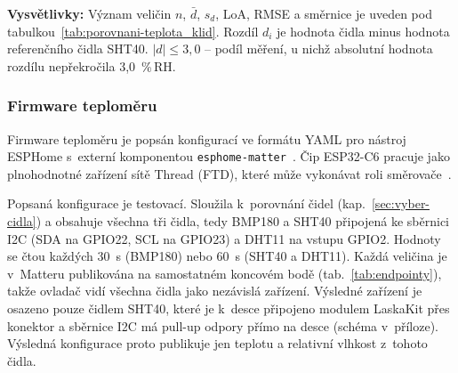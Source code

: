 \begin{table}[ht]
\centering
\small
\setlength{\tabcolsep}{4pt}
\caption{Porovnání čidel (vlhkost), rozdíl čidla a referenčního SHT40 (jen klidné minuty)}
\label{tab:porovnani-vlhkost_klid}
\vspace{2mm}

\begin{minipage}{0.95\textwidth}
\footnotesize
\raggedright
\textbf{Vysvětlivky:} Význam veličin $n$, $\bar{d}$, $s_d$, LoA, RMSE a směrnice
je uveden pod tabulkou~\ref{tab:porovnani-teplota_klid}. Rozdíl $d_i$ je
hodnota čidla minus hodnota referenčního čidla SHT40. $|d|\le 3{,}0$ -- podíl
měření, u nichž absolutní hodnota rozdílu nepřekročila 3,0~\%\,RH.
\end{minipage}
\end{table}

\subsubsection{Firmware teploměru}

Firmware teploměru je popsán konfigurací ve formátu YAML pro nástroj ESPHome
s~externí komponentou \texttt{esphome-matter}~\cite{esphome-matter}. Čip
ESP32-C6 pracuje jako plnohodnotné zařízení sítě Thread (FTD), které může
vykonávat roli směrovače~\cite{esphome-openthread}.

Popsaná konfigurace je testovací. Sloužila k~porovnání čidel
(kap.~\ref{sec:vyber-cidla}) a obsahuje všechna tři čidla, tedy BMP180
a SHT40 připojená ke sběrnici I2C (SDA na GPIO22, SCL na GPIO23) a DHT11
na vstupu GPIO2. Hodnoty se čtou každých 30~s (BMP180) nebo 60~s (SHT40
a DHT11). Každá veličina je v~Matteru publikována na samostatném koncovém
bodě (tab.~\ref{tab:endpointy}), takže ovladač vidí všechna čidla jako
nezávislá zařízení. Výsledné zařízení je osazeno pouze čidlem SHT40, které
je k~desce připojeno modulem LaskaKit přes konektor a sběrnice I2C má
pull-up odpory přímo na desce (schéma v~příloze). Výsledná konfigurace
proto publikuje jen teplotu a relativní vlhkost z~tohoto čidla.

